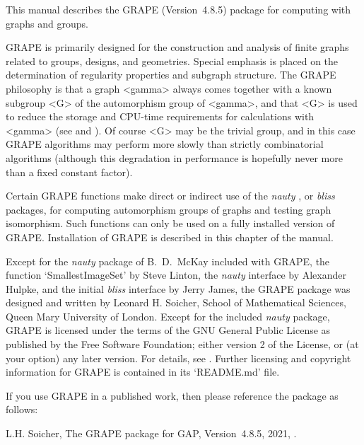 %
%
%
%
\def\GRAPE{\sf GRAPE}
\def\DESIGN{\sf DESIGN}
\def\nauty{\it nauty}
\def\bliss{\it bliss}
\def\Aut{{\rm Aut}\,} 


This manual describes the {\GRAPE} (Version~4.8.5) package for computing
with graphs and groups.

{\GRAPE} is primarily designed for the construction and analysis of
finite graphs related to groups, designs, and geometries. Special
emphasis is placed on the determination of regularity properties and
subgraph structure. The {\GRAPE} philosophy is that a graph <gamma>
always comes together with a known subgroup <G> of the automorphism
group of <gamma>, and that <G> is used to reduce the storage and
CPU-time requirements for calculations with <gamma> (see
\cite{Soi93} and \cite{Soi04}).  Of course <G> may be the trivial group,
and in this case {\GRAPE} algorithms may perform more slowly than strictly
combinatorial algorithms (although this degradation in performance is
hopefully never more than a fixed constant factor).

Certain {\GRAPE} functions make direct or indirect use of the {\nauty}
\cite{Nau90}, \cite{MP14} or {\bliss} \cite{JK07} packages, for computing
automorphism groups of graphs and testing graph isomorphism. Such functions
can only be used on a fully installed version of {\GRAPE}. Installation
of {\GRAPE} is described in this chapter of the manual.

Except for the {\nauty} package of B.~D.~McKay included with {\GRAPE},
the function `SmallestImageSet' by Steve Linton, the {\nauty} interface
by Alexander Hulpke, and the initial {\bliss} interface by Jerry James,
the {\GRAPE} package was designed and written by Leonard H. Soicher,
School of Mathematical Sciences, Queen Mary University of London.
Except for the included {\nauty} package, {\GRAPE} is licensed under the
terms of the GNU General Public License as published by the Free Software
Foundation; either version 2 of the License, or (at your option) any later
version. For details, see .
Further licensing and copyright information for {\GRAPE} is contained
in its `README.md' file.

If you use {\GRAPE} in a published work, then please reference the
package as follows:

L.H. Soicher, The {GRAPE} package for {GAP}, Version~4.8.5, 2021,
.


